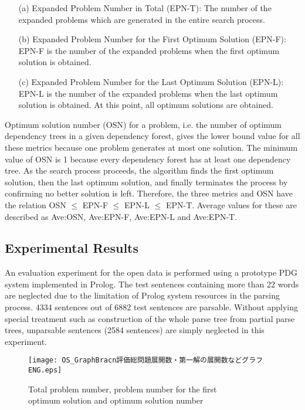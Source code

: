 \begin{itemize}
\item[(a)] Expanded Problem Number in Total (EPN-T): The number of the
expanded problems which are generated in the entire search process.

\item[(b)] Expanded Problem Number for the First Optimum
Solution (EPN-F): 
EPN-F is the number of the expanded problems when the first optimum
solution is obtained.

\item[(c)] Expanded Problem Number for the Last Optimum
Solution (EPN-L): EPN-L is the number of the expanded problems when the last optimum
solution is obtained. At this point, all optimum solutions are obtained.

\end{itemize}

{\mynoindent}Optimum solution number (OSN) for a problem, i.e. the
number of optimum dependency trees in a given dependency forest, gives
the lower bound value for all these metrics because one problem
generates at most one solution. The minimum value of OSN is 1 because
every dependency forest has at least one dependency tree. As the search
process proceeds, the algorithm finds the first optimum solution, then
the last optimum solution, and finally terminates the process by
confirming no better solution is left. Therefore, the three metrics and
OSN have the relation OSN ${\leq}$ EPN-F ${\leq}$ EPN-L ${\leq}$
EPN-T. Average values for these are described as Ave:OSN, Ave:EPN-F,
Ave:EPN-L and Ave:EPN-T.

\subsection{Experimental Results}

An evaluation experiment for the open data is performed using a
prototype PDG system implemented in Prolog. The test sentences
containing more than 22 words are neglected due to the limitation of
Prolog system resources in the parsing process. 4334 sentences out of
6882 test sentences are parsable. Without applying special treatment
such as construction of the whole parse tree from partial parse trees,
unparsable sentences (2584 sentences) are simply neglected in this
experiment. 

\begin{figure}[b]
\myfiglabelskippre
 \begin{center}
    \texttt{[image: OS\_GraphBracn評価総問題展開数・第一解の展開数などグラフENG.eps]}
 \end{center}
\myfiglabelskippre
\caption{Total problem number, problem number for the first\\ optimum solution and optimum solution number}
\label{fig:OptSolSrcExperimentResult}
\myfiglabelskippre
\end{figure}

